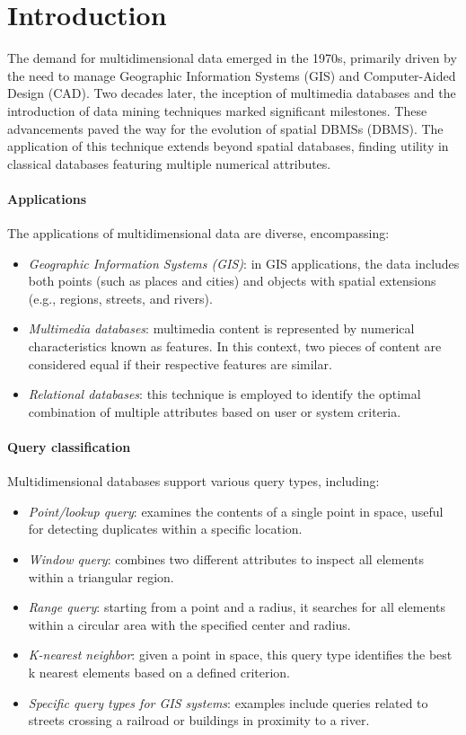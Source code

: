 \section{Introduction}

The demand for multidimensional data emerged in the 1970s, primarily driven by the need to manage Geographic Information Systems (GIS) and Computer-Aided Design (CAD).
Two decades later, the inception of multimedia databases and the introduction of data mining techniques marked significant milestones.
These advancements paved the way for the evolution of spatial DBMSs (DBMS).
The application of this technique extends beyond spatial databases, finding utility in classical databases featuring multiple numerical attributes.

\paragraph*{Applications}
The applications of multidimensional data are diverse, encompassing:
\begin{itemize}
    \item \textit{Geographic Information Systems (GIS)}: in GIS applications, the data includes both points (such as places and cities) and objects with spatial extensions (e.g., regions, streets, and rivers).
    \item \textit{Multimedia databases}: multimedia content is represented by numerical characteristics known as features. 
        In this context, two pieces of content are considered equal if their respective features are similar.
    \item \textit{Relational databases}: this technique is employed to identify the optimal combination of multiple attributes based on user or system criteria.
\end{itemize}

\paragraph*{Query classification}
Multidimensional databases support various query types, including:
\begin{itemize}
    \item \textit{Point/lookup query}: examines the contents of a single point in space, useful for detecting duplicates within a specific location.
    \item \textit{Window query}: combines two different attributes to inspect all elements within a triangular region.
    \item \textit{Range query}: starting from a point and a radius, it searches for all elements within a circular area with the specified center and radius.
    \item \textit{K-nearest neighbor}: given a point in space, this query type identifies the best k nearest elements based on a defined criterion.
    \item \textit{Specific query types for GIS systems}: examples include queries related to streets crossing a railroad or buildings in proximity to a river.
\end{itemize}

